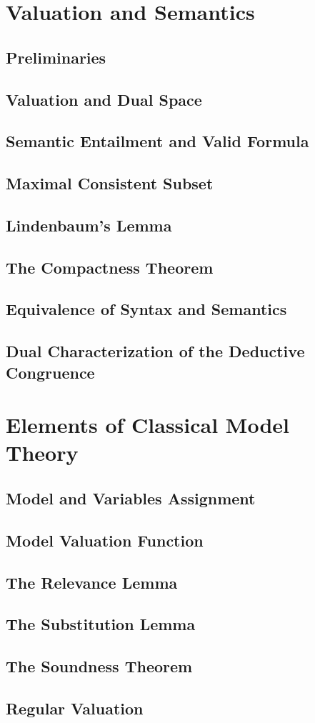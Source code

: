 \section{Valuation and Semantics}
    \subsection{Preliminaries}
      
    \subsection{Valuation and Dual Space}
      
    \subsection{Semantic Entailment and Valid Formula}
      
    \subsection{Maximal Consistent Subset}
      
    \subsection{Lindenbaum's Lemma}
      
    \subsection{The Compactness Theorem}
      
    \subsection{Equivalence of Syntax and Semantics}
      
    \subsection{Dual Characterization of the Deductive Congruence}
      
\section{Elements of Classical Model Theory}
    \subsection{Model and Variables Assignment}
      
    \subsection{Model Valuation Function}
      
    \subsection{The Relevance Lemma}
      
    \subsection{The Substitution Lemma}
      
    \subsection{The Soundness Theorem}
      
    \subsection{Regular Valuation}
      

